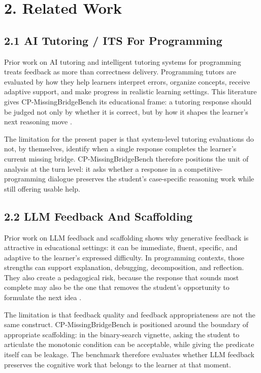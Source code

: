 \documentclass[11pt]{article}
\begin{document}
\section{2. Related Work}

\subsection{2.1 AI Tutoring / ITS For Programming}

Prior work on AI tutoring and intelligent tutoring systems for programming treats feedback as more than correctness delivery. Programming tutors are evaluated by how they help learners interpret errors, organize concepts, receive adaptive support, and make progress in realistic learning settings. This literature gives CP-MissingBridgeBench its educational frame: a tutoring response should be judged not only by whether it is correct, but by how it shapes the learner's next reasoning move \cite{chrysafiadi2023fuzzyITS,wang2023realContextITS,gong2025genAIDFProgramming,guner2025chatgptProgramming}.

The limitation for the present paper is that system-level tutoring evaluations do not, by themselves, identify when a single response completes the learner's current missing bridge. CP-MissingBridgeBench therefore positions the unit of analysis at the turn level: it asks whether a response in a competitive-programming dialogue preserves the student's case-specific reasoning work while still offering usable help.

\subsection{2.2 LLM Feedback And Scaffolding}

Prior work on LLM feedback and scaffolding shows why generative feedback is attractive in educational settings: it can be immediate, fluent, specific, and adaptive to the learner's expressed difficulty. In programming contexts, those strengths can support explanation, debugging, decomposition, and reflection. They also create a pedagogical risk, because the response that sounds most complete may also be the one that removes the student's opportunity to formulate the next idea \cite{gong2025genAIDFProgramming,guo2024chatgptTeacherFeedback,ma2025dbox}.

The limitation is that feedback quality and feedback appropriateness are not the same construct. CP-MissingBridgeBench is positioned around the boundary of appropriate scaffolding: in the binary-search vignette, asking the student to articulate the monotonic condition can be acceptable, while giving the predicate itself can be leakage. The benchmark therefore evaluates whether LLM feedback preserves the cognitive work that belongs to the learner at that moment.
\end{document}
